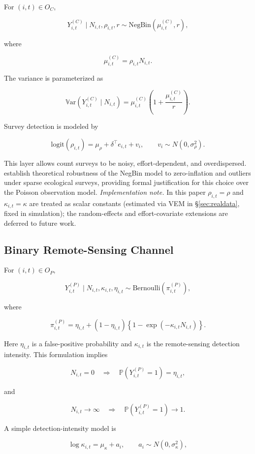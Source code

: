 \documentclass[review,12pt]{elsarticle}
\theoremstyle{definition}
\newcommand{\Var}{\mathbb{V}\mathrm{ar}}
\newcommand{\Prob}{\mathbb{P}}
\begin{document}
For \((i,t)\in O_C\),

\[
Y^{(C)}_{i,t}\mid N_{i,t},\rho_{i,t},r
\sim
\mathrm{NegBin}(\mu^{(C)}_{i,t},r),
\]

where

\[
\mu^{(C)}_{i,t}=\rho_{i,t}N_{i,t}.
\]

The variance is parameterized as

\[
\Var(Y^{(C)}_{i,t}\mid N_{i,t})
=
\mu^{(C)}_{i,t}
\left(1+\frac{\mu^{(C)}_{i,t}}{r}\right).
\]

Survey detection is modeled by

\[
\mathrm{logit}(\rho_{i,t})
=
\mu_\rho+\delta^\top e_{i,t}+v_i,
\qquad
v_i\sim N(0,\sigma_\rho^2).
\]

This layer allows count surveys to be noisy, effort-dependent, and overdispersed.
\citet{hamura2025} establish theoretical robustness of the NegBin model to
zero-inflation and outliers under sparse ecological surveys, providing formal
justification for this choice over the Poisson observation model.
\emph{Implementation note.}  In this paper $\rho_{i,t}=\rho$ and
$\kappa_{i,t}=\kappa$ are treated as scalar constants (estimated via VEM in
\S\ref{sec:realdata}, fixed in simulation); the random-effects and
effort-covariate extensions are deferred to future work.

\subsection{Binary Remote-Sensing Channel}

For \((i,t)\in O_P\),

\[
Y^{(P)}_{i,t}\mid N_{i,t},\kappa_{i,t},\eta_{i,t}
\sim
\mathrm{Bernoulli}(\pi^{(P)}_{i,t}),
\]

where

\[
\pi^{(P)}_{i,t}
=
\eta_{i,t}
+
(1-\eta_{i,t})
\left\{1-\exp(-\kappa_{i,t}N_{i,t})\right\}.
\]

Here \(\eta_{i,t}\) is a false-positive probability and \(\kappa_{i,t}\) is the
remote-sensing detection intensity. This formulation implies

\[
N_{i,t}=0
\quad\Rightarrow\quad
\Prob(Y^{(P)}_{i,t}=1)=\eta_{i,t},
\]

and

\[
N_{i,t}\to\infty
\quad\Rightarrow\quad
\Prob(Y^{(P)}_{i,t}=1)\to 1.
\]

A simple detection-intensity model is

\[
\log\kappa_{i,t}
=
\mu_\kappa+a_i,
\qquad
a_i\sim N(0,\sigma_\kappa^2),
\]
\end{document}
